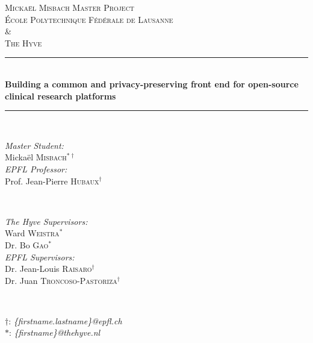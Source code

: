 \begin{titlepage}

\newcommand{\HRule}{\rule{\linewidth}{0.5mm}}
\center
 
\textsc{\LARGE Mickaël Misbach Master Project}\\[0.5cm]

\textsc{\Large École Polytechnique Fédérale de Lausanne}\\ 
\textsc{\Large \&}\\ 
\textsc{\Large The Hyve}\\[0.5cm] 

\HRule \\[0.4cm]
{ \huge \bfseries Building a common and privacy-preserving front end for open-source clinical research platforms}\\[0.4cm]
\HRule \\[1cm]
 
\begin{minipage}{0.4\textwidth}
\begin{flushleft} \large
\emph{Master Student:}\\
Mickaël \textsc{Misbach}$^{*\dagger}$\\[\baselineskip]
\emph{EPFL Professor:} \\
Prof. Jean-Pierre \textsc{Hubaux}$^\dagger$\\
\end{flushleft}
\end{minipage}
~
\begin{minipage}{0.5\textwidth}
\begin{flushright} \large
\emph{The Hyve Supervisors:} \\
Ward \textsc{Weistra}$^*$\\
Dr. Bo \textsc{Gao}$^*$\\[\baselineskip]
\emph{EPFL Supervisors:} \\
Dr. Jean-Louis \textsc{Raisaro}$^\dagger$\\
Dr. Juan \textsc{Troncoso-Pastoriza}$^\dagger$\\
\end{flushright}
\end{minipage}
~ \\[0.5cm]
\begin{minipage}{1\textwidth}
\begin{flushbottom}
\centering\small
$\dagger$: \emph{\{firstname.lastname\}@epfl.ch} \\
$*$: \emph{\{firstname\}@thehyve.nl} \\
\end{flushbottom}
\end{minipage}\\[2cm]



\end{titlepage}
